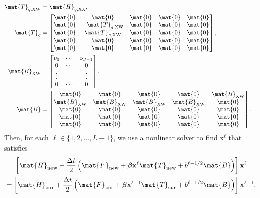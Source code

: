 \documentclass{jpmarticle}
\renewcommand{\vec}[1]{\boldsymbol{\mathrm{#1}}}
\let\subequationsorig\subequations%
\let\endsubequationsorig\endsubequations%
\renewenvironment{subequations}{
  \subequationsorig
  \renewcommand{\theequation}{\theparentequation.\arabic{equation}}
}{
  \endsubequationsorig
}
\begin{document}
\begin{subequations}
\begin{align}
    \\
    \mat{T}_{q, \mathrm{XW}} &= \mat{H}_{q, \mathrm{XX}},
    \\
    \mat{T}_q &=
    \begin{bmatrix}
      \mat{0} & \mat{0} & \mat{0} & \mat{0} & \mat{0}
      \\
      \mat{0} & - \mat{T}_{q, \mathrm{XW}} & \mat{0} & \mat{0} & \mat{0}
      \\
      \mat{0} & \mat{T}_{q, \mathrm{XW}} & \mat{0} & \mat{0} & \mat{0}
      \\
      \mat{0} & \mat{0} & \mat{0} & \mat{0} & \mat{0}
      \\
      \mat{0} & \mat{0} & \mat{0} & \mat{0} & \mat{0}
    \end{bmatrix},
    \\
    \mat{B}_{\mathrm{XW}} &=
    \begin{bmatrix}
      \nu_0 & \cdots & \nu_{J - 1} \\
      0 & \cdots & 0 \\
      \vdots & & \vdots \\
      0 & \cdots & 0
    \end{bmatrix},
    \\
    \mat{B} &=
    \begin{bmatrix}
      \mat{0} & \mat{0} & \mat{0} & \mat{0} & \mat{B}_{\mathrm{XW}}
      \\
      \mat{B}_{\mathrm{XW}} & \mat{B}_{\mathrm{XW}} & \mat{B}_{\mathrm{XW}}
      & \mat{B}_{\mathrm{XW}} & \mat{0}
      \\
      \mat{0} & \mat{0} & \mat{0} & \mat{0} & \mat{0}
      \\
      \mat{0} & \mat{0} & \mat{0} & \mat{0} & \mat{0}
      \\
      \mat{0} & \mat{0} & \mat{0} & \mat{0} & \mat{0}
    \end{bmatrix}.
  \end{align}
  Then, for each $\ell \in \{1, 2, \ldots, L - 1\}$,
  we use a nonlinear solver to find $\vec{x}^{\ell}$ that satisfies
  \begin{multline}
    \label{step_age_structured}
    \left[
      \mat{H}_{\mathrm{new}}
      - \frac{\Delta t}{2}
      \left(
        \mat{F}_{\mathrm{new}}
        + \vec{\beta} \vec{x}^{\ell} \mat{T}_{\mathrm{new}}
        + b^{\ell - 1 / 2} \mat{B}
      \right)
    \right] \vec{x}^{\ell}
    \\
    = \left[
      \mat{H}_{\mathrm{cur}}
      + \frac{\Delta t}{2}
      \left(
        \mat{F}_{\mathrm{cur}}
        + \vec{\beta} \vec{x}^{\ell - 1} \mat{T}_{\mathrm{cur}}
        + b^{\ell - 1 / 2} \mat{B}
      \right)
    \right] \vec{x}^{\ell - 1}.
  \end{multline}
\end{subequations}
\end{document}
